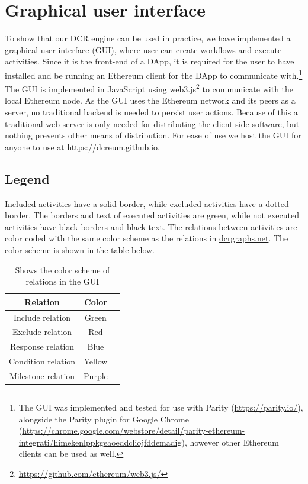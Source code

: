 \documentclass{article}
\begin{document}
	\section{Graphical user interface}
	\label{sec:gui}
	To show that our DCR engine can be used in practice, we have implemented a graphical user interface (GUI), where user can create workflows and execute activities.
	Since it is the front-end of a DApp, it is required for the user to have installed and be running an Ethereum client for the DApp to communicate with.\footnote{The GUI was implemented and tested for use with Parity (\url{https://parity.io/}), alongside the Parity plugin for Google Chrome (\url{https://chrome.google.com/webstore/detail/parity-ethereum-integrati/himekenlppkgeaoeddcliojfddemadig}), however other Ethereum clients can be used as well.}
	The GUI is implemented in JavaScript using web3.js\footnote{\url{https://github.com/ethereum/web3.js/}} to communicate with the local Ethereum node.
	As the GUI uses the Ethereum network and its peers as a server, no traditional backend is needed to persist user actions.
	Because of this a traditional web server is only needed for distributing the client-side software, but nothing prevents other means of distribution.
	For ease of use we host the GUI for anyone to use at \url{https://dcreum.github.io}.

		\subsection{Legend}
		Included activities have a solid border, while excluded activities have a dotted border. 
		The borders and text of executed activities are green, while not executed activities have black borders and black text.
		The relations between activities are color coded with the same color scheme as the relations in \href{http://www.dcrgraphs.net}{dcrgraphs.net}. The color scheme is shown in the table below.

		\begin{table}[!ht]
			\label{table:relation-color}
			\centering
			\begin{tabular}{|c|c|c|}
			\hline
			\textbf{Relation} 	& \textbf{Color} \\ \hline
			Include relation    & Green \\\hline
			Exclude relation    & Red \\\hline
			Response relation   & Blue \\\hline
			Condition relation  & Yellow \\\hline
			Milestone relation  & Purple \\\hline
			\end{tabular}
			\caption{Shows the color scheme of relations in the GUI}
		\end{table}
\end{document}
